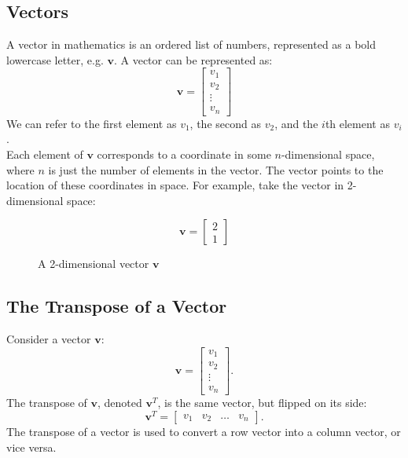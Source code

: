 \documentclass[9pt]{extarticle}
\begin{document}
\subsection*{Vectors}
A vector in mathematics is an ordered list of numbers, represented as a bold lowercase letter, e.g. $\mathbf{v}$. A vector can be represented as:
$$\mathbf{v} = \begin{bmatrix} v_1 \\ v_2 \\ \vdots \\ v_n \end{bmatrix}$$
We can refer to the first element as $v_1$, the second as $v_2$, and the $i$th element as $v_i$. \\
Each element of $\mathbf{v}$ corresponds to a coordinate in some $n$-dimensional space, where $n$ is just the number of elements in the vector. The vector points to the location of these coordinates in space. For example, take the vector in 2-dimensional space:
\begin{figure}[h]
    \begin{subfigure}[c]{0.48\textwidth}
        \centering
        $$\mathbf{v} = \begin{bmatrix} 2 \\ 1 \end{bmatrix}$$
    \end{subfigure}
    \begin{subfigure}[c]{0.48\textwidth}
        \centering
    \end{subfigure}
    \caption{A 2-dimensional vector $\mathbf{v}$}
\end{figure}

\subsection*{The Transpose of a Vector}
Consider a vector $\mathbf{v}$:
$$\mathbf{v} = \begin{bmatrix} v_1 \\ v_2 \\ \vdots \\ v_n \end{bmatrix}.$$
The transpose of $\mathbf{v}$, denoted $\mathbf{v}^T$, is the same vector, but flipped on its side:
$$\mathbf{v}^T = \begin{bmatrix} v_1 & v_2 & \ldots & v_n \end{bmatrix}.$$
The transpose of a vector is used to convert a row vector into a column vector, or vice versa.
\end{document}

